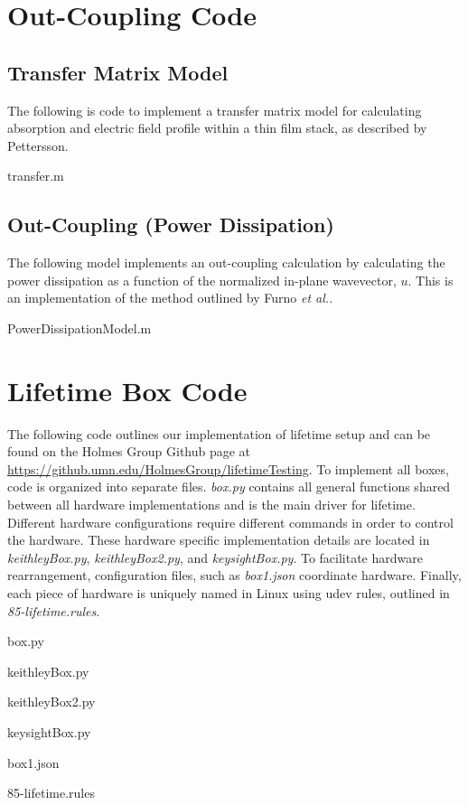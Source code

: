 \documentclass[../thesis.tex]{subfiles}
\begin{document}
\chapter{Out-Coupling Code}\label{sec:outCoupling_code}
\section{Transfer Matrix Model}
The following is code to implement a transfer matrix model for calculating absorption and electric field profile within a thin film stack, as described by Pettersson.\supercite{Pettersson1999}

transfer.m


\section{Out-Coupling (Power Dissipation)}
The following model implements an out-coupling calculation by calculating the power dissipation as a function of the normalized in-plane wavevector, $u$.  
This is an implementation of the method outlined by Furno \textit{et al.}.\supercite{Furno2010,Furno2012}

PowerDissipationModel.m


\chapter{Lifetime Box Code}\label{sec:lifetime_code}

The following code outlines our implementation of lifetime setup and can be found on the Holmes Group Github page at \url{https://github.umn.edu/HolmesGroup/lifetimeTesting}.
To implement all boxes, code is organized into separate files.
\textit{box.py} contains all general functions shared between all hardware implementations and is the main driver for lifetime.
Different hardware configurations require different commands in order to control the hardware.
These hardware specific implementation details are located in \textit{keithleyBox.py}, \textit{keithleyBox2.py}, and \textit{keysightBox.py}.
To facilitate hardware rearrangement, configuration files, such as \textit{box1.json} coordinate hardware.
Finally, each piece of hardware is uniquely named in Linux using udev rules, outlined in \textit{85-lifetime.rules}.

box.py
%

keithleyBox.py
%

keithleyBox2.py
%

keysightBox.py
%

box1.json
%

85-lifetime.rules
%



\end{document}
